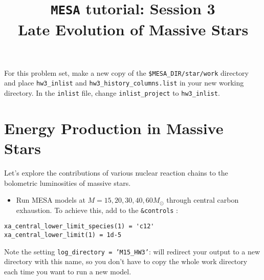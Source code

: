 \documentclass[11pt,a4paper]{article}
\begin{document}
\title{
    \textbf{\texttt{MESA} tutorial:  Session 3} \\
    \textbf{\Large Late Evolution of Massive Stars}
}
\date{}
\maketitle
\vspace{-1cm}


For this problem set, make a new copy of the \texttt{\$MESA\_DIR/star/work} 
directory and place \texttt{hw3\_inlist} and \texttt{hw3\_history\_columns.list} in your new working directory.
In the \texttt{inlist} file, change \texttt{inlist\_project} to \texttt{hw3\_inlist}.


\section{Energy Production in Massive Stars}

Let's explore the contributions of various nuclear reaction chains to the bolometric luminosities of massive stars.

\begin{itemize}
    \item Run MESA models at $M = 15, 20, 30, 40, 60 M_\odot$ through central carbon exhaustion.
    To achieve this, add to the \texttt{\&controls} :
\end{itemize}
    \begin{lstlisting}
xa_central_lower_limit_species(1) = 'c12'
xa_central_lower_limit(1) = 1d-5
    \end{lstlisting}

Note the setting \texttt{log\_directory = 'M15\_HW3'}: will redirect your output to a new directory with this name, so you don't have to copy the whole work directory each time you want to run a new model.
\end{document}
